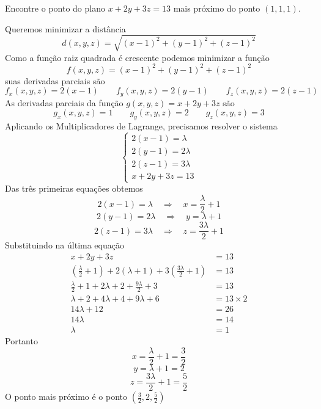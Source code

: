 \documentclass[a4paper,12pt,fleqn]{article}
\newcommand{\comentario}[1]{{\color{magenta} #1 \par\vspace{\baselineskip}\par}}
\begin{document}

%

Encontre o ponto do plano \(x+2y+3z=13\) mais próximo do ponto \((1, 1, 1)\).

\begin{answer}
  Queremos minimizar a distância
  \[
    d(x, y, z) = \sqrt{(x-1)^2 + (y-1)^2 + (z-1)^2}
  \]
  Como a função raiz quadrada é crescente podemos minimizar a função
  \[
    f(x, y, z) = (x-1)^2 + (y-1)^2 + (z-1)^2
  \]
  suas derivadas parciais são
  \[
    f_x(x, y, z) = 2(x-1)
    \qquad
    f_y(x, y, z) = 2(y-1)
    \qquad
    f_z(x, y, z) = 2(z-1)
  \]
  As derivadas parciais da função \(g(x, y, z)=x+2y+3z\) são
  \[
    g_x(x, y, z) = 1
    \qquad
    g_y(x, y, z) = 2
    \qquad
    g_z(x, y, z) = 3
  \]
  Aplicando os Multiplicadores de Lagrange, precisamos resolver o sistema
  \[
  \begin{cases}
    2(x-1) =  \lambda \\
    2(y-1) = 2\lambda \\
    2(z-1) = 3\lambda \\
    x + 2y + 3z = 13
  \end{cases}
  \]
  Das três primeiras equações obtemos
  \[
    2(x-1) = \lambda
    \quad\Rightarrow\quad
    x = \frac{\lambda}{2} + 1
  \]
  \[
    2(y-1) = 2\lambda
    \quad\Rightarrow\quad
    y = \lambda + 1
  \]
  \[
    2(z-1) = 3\lambda
    \quad\Rightarrow\quad
    z = \frac{3\lambda}{2} + 1
  \]
  Substituindo na última equação
  \begin{align*}
    x + 2y + 3z & = 13
    \\[2mm]
    \left(\frac{\lambda}{2} + 1\right)
    + 2 \left(\lambda + 1\right)
    + 3 \left(\frac{3\lambda}{2} + 1\right) & = 13
    \\[2mm]
    \frac{\lambda}{2} + 1
    + 2\lambda + 2
    + \frac{9\lambda}{2} + 3 & = 13
    \\[2mm]
    \lambda + 2
    + 4\lambda + 4
    + 9\lambda + 6 & = 13\times 2
    \\[2mm]
    14\lambda + 12 & = 26
    \\[2mm]
    14\lambda & = 14
    \\[2mm]
    \lambda & = 1
  \end{align*}
  Portanto
  \[
    x = \frac{\lambda}{2} + 1 = \frac{3}{2}
  \]
  \[
    y = \lambda + 1 = 2
  \]
  \[
    z = \frac{3\lambda}{2} + 1 = \frac{5}{2}
  \]
  O ponto mais próximo é o ponto \(\left(\frac{3}{2}, 2, \frac{5}{2}\right)\)
  \clearpage
\end{answer}
\end{document}
